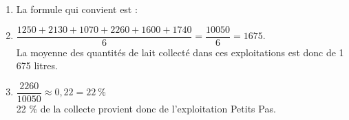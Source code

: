 
\medskip

\begin{enumerate}
  \item La formule qui convient est : 
  \item $\dfrac{1250+2130+1070+2260+1600+1740}{6}=\dfrac{10050}{6}=1675$.\\
  La moyenne des quantités de lait collecté dans ces exploitations est donc de 1 675 litres.
  \item $\dfrac{2260}{10050} \approx 0,22 = 22~\%$\\
  22 \% de la collecte provient donc de l'exploitation \og Petits Pas\fg{}.
\end{enumerate}

\medskip

